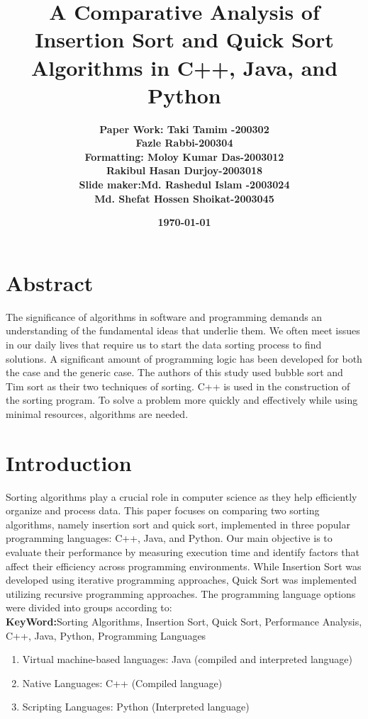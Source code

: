 \documentclass[twocolumn]{article}
\title{\textbf{A Comparative Analysis of Insertion Sort and Quick Sort Algorithms in C++, Java, and Python} }
\author{
   \textbf{Paper Work: Taki Tamim -200302} \\
 \hspace{70pt} \textbf{Fazle Rabbi-200304}\\
 \hspace{30pt}\textbf{Formatting: Moloy Kumar Das-2003012}\\
 \vspace{20pt}
\hspace{130pt}\textbf{Rakibul Hasan Durjoy-2003018}\\
\hspace{40pt}\textbf{Slide maker:}\hspace{5pt}\textbf{Md. Rashedul Islam -2003024}\\
\vspace{20pt}
\hspace{150pt}\textbf{Md. Shefat Hossen Shoikat-2003045}\\
}
\date{\textbf{\today}}
\begin{document}
\maketitle

\section{Abstract}
	The significance of algorithms in software and programming demands an understanding of the fundamental ideas that underlie them. We often meet issues in our daily lives that require us to start the data sorting process to find solutions. A significant amount of programming logic has been developed for both the case and the generic case. The authors of this study used bubble sort and Tim sort as their two techniques of sorting. C++ is used in the construction of the sorting program. To solve a problem more quickly and effectively while using minimal resources, algorithms are needed.


\section{Introduction}
Sorting algorithms play a crucial role in computer science as they help efficiently organize and process data.\cite{1} This paper focuses on comparing two sorting algorithms, namely insertion sort and quick sort, implemented in three popular programming languages: C++, Java, and Python. Our main objective is to evaluate their performance by measuring execution time and identify factors that affect their efficiency across programming environments. While Insertion Sort was developed using iterative programming approaches, Quick Sort was implemented utilizing recursive programming approaches.\cite{1} \cite{2}The programming language options were divided into groups according to: \\
\textbf{KeyWord:}Sorting Algorithms, Insertion Sort, Quick Sort, Performance Analysis, C++, Java, Python, Programming Languages

\begin{enumerate}
	\item Virtual machine-based languages: Java (compiled and interpreted language)
	\item Native Languages: C++ (Compiled language)
	\item Scripting Languages: Python (Interpreted language)\cite{3}
  \end{enumerate}
\end{document}
